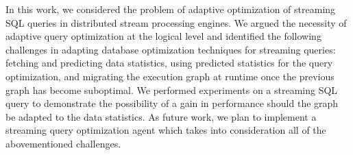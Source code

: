 \label {sec:fs-optimization-conclusion}
In this work, we considered the problem of adaptive optimization of streaming SQL queries in distributed stream processing engines. We argued the necessity of adaptive query optimization at the logical level and identified the following challenges in adapting database optimization techniques for streaming queries: fetching and predicting data statistics, using predicted statistics for the query optimization, and migrating the execution graph at runtime once the previous graph has become suboptimal. We performed experiments on a streaming SQL query to demonstrate the possibility of a gain in performance should the graph be adapted to the data statistics. As future work, we plan to implement a streaming query optimization agent which takes into consideration all of the abovementioned challenges.